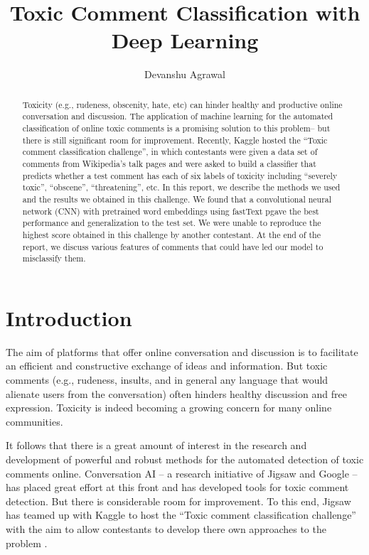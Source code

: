 \documentclass[12pt]{article}
\begin{document}
\title[Toxic Comment Classification]{Toxic Comment Classification with Deep Learning}

\author{Devanshu Agrawal}

\begin{abstract}
Toxicity (e.g., rudeness, obscenity, hate, etc) can hinder healthy and productive online conversation and discussion. The application of machine learning for the automated classification of online toxic comments is a promising solution to this problem-- but there is still significant room for improvement. Recently, Kaggle hosted the ``Toxic comment classification challenge'', in which contestants were given a data set of comments from Wikipedia's talk pages and were asked to build a classifier that predicts whether a test comment has each of six labels of toxicity including ``severely toxic'', ``obscene'', ``threatening'', etc. In this report, we describe the methods we used and the results we obtained in this challenge. We found that a convolutional neural network (CNN) with pretrained word embeddings using fastText pgave the best performance and generalization to the test set. We were unable to reproduce the highest score obtained in this challenge by another contestant. At the end of the report, we discuss various features of comments that could have led our model to misclassify them.
\end{abstract}

\maketitle


\section{Introduction}

The aim of platforms that offer online conversation and discussion is to facilitate an efficient and constructive  exchange of ideas and information. But toxic comments (e.g., rudeness, insults, and in general any language that would alienate users from the conversation) often hinders healthy discussion and free expression. Toxicity is indeed becoming a growing concern for many online communities.

It follows that there is a great amount of interest in the research and development of powerful and robust methods for the automated detection of toxic comments online. Conversation AI -- a research initiative of Jigsaw and Google -- has placed great effort at this front and has developed tools for toxic comment detection. But there is considerable room for improvement. To this end, Jigsaw has teamed up with Kaggle to host the ``Toxic comment classification challenge'' with the aim to allow contestants to develop there own approaches to the problem \cite{kaggle}.
\end{document}
